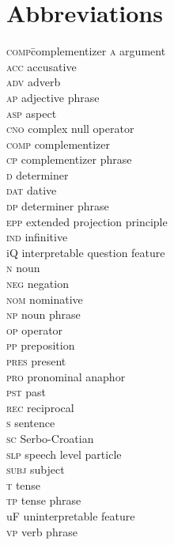 \documentclass[output=paper,colorlinks,citecolor=brown,
]{langscibook}
\begin{document}
\section*{Abbreviations}
\begin{multicols}{2}
\begin{tabbing}
\textsc{comp}\hspace{1ex}\=complementizer\kill
\textsc{a}    \> argument\\
\textsc{acc}  \> accusative\\
\textsc{adv}  \> adverb\\
\textsc{ap}   \> adjective phrase\\
\textsc{asp}  \> aspect\\
\textsc{cno}  \> complex null operator\\
\textsc{comp} \> complementizer\\
\textsc{cp}   \> complementizer phrase\\
\textsc{d}    \> determiner\\
\textsc{dat}  \> dative\\
\textsc{dp}   \> determiner phrase\\
\textsc{epp}  \> extended projection principle\\
\textsc{ind}  \> infinitive\\
{iQ}   \> interpretable question feature\\
\textsc{n}    \> noun\\
\textsc{neg}  \> negation\\
 \textsc{nom}  \> nominative\\
 \textsc{np}   \> noun phrase\\
 \textsc{op}   \> operator\\
\textsc{pp}   \> preposition\\
 \textsc{pres} \> present\\
\textsc{pro}  \> pronominal anaphor\\
 \textsc{pst}  \> past\\
 \textsc{rec}  \> reciprocal\\
 \textsc{s}    \> sentence\\
\textsc{sc}   \> Serbo-Croatian\\
 \textsc{slp}  \> speech level particle\\
 \textsc{subj} \> subject\\
 \textsc{t}    \> tense\\
 \textsc{tp}   \> tense phrase\\
 {uF}   \> uninterpretable feature\\
\textsc{vp}   \> verb phrase           \\
\end{tabbing}
\end{multicols}
\end{document}
